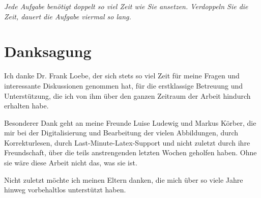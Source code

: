 
\begin{flushright}{\slshape
    Jede Aufgabe benötigt doppelt so viel Zeit wie Sie ansetzen. Verdoppeln Sie die Zeit, dauert die Aufgabe viermal so lang. }%
\end{flushright}



\bigskip

\begingroup
\let\clearpage\relax
\let\cleardoublepage\relax
\let\cleardoublepage\relax
\chapter*{Danksagung}

Ich danke Dr. Frank Loebe, der sich stets so viel Zeit für meine Fragen und interessante Diskussionen genommen hat, für die erstklassige Betreuung und Unterstützung, die ich von ihm über den ganzen Zeitraum der Arbeit hindurch erhalten habe.

Besonderer Dank geht an meine Freunde Luise Ludewig und Markus Körber, die mir bei der Digitalisierung und Bearbeitung der vielen Abbildungen, durch Korrekturlesen, durch Last-Minute-Latex-Support und nicht zuletzt durch ihre Freundschaft, über die teils anstrengenden letzten Wochen geholfen haben. 
Ohne sie wäre diese Arbeit nicht das, was sie ist.

Nicht zuletzt möchte ich meinen Eltern danken, die mich über so viele Jahre hinweg vorbehaltlos unterstützt haben.


\endgroup
